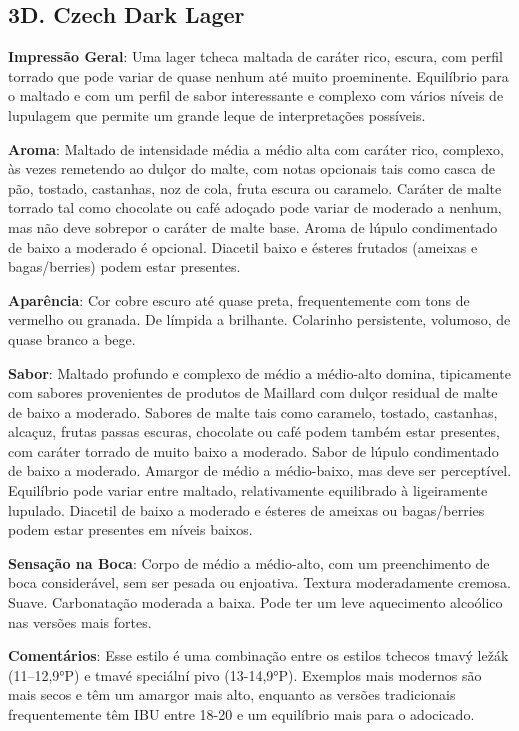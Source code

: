 \subsection*{3D. Czech Dark Lager}
\textbf{Impressão Geral}: Uma lager tcheca maltada de caráter rico, escura, com perfil torrado que pode variar de quase nenhum até muito proeminente. Equilíbrio para o maltado e com um perfil de sabor interessante e complexo com vários níveis de lupulagem que permite um grande leque de interpretações possíveis.

\textbf{Aroma}: Maltado de intensidade média a médio alta com caráter rico, complexo, às vezes remetendo ao dulçor do malte, com notas opcionais tais como casca de pão, tostado, castanhas, noz de cola, fruta escura ou caramelo. Caráter de malte torrado tal como chocolate ou café adoçado pode variar de moderado a nenhum, mas não deve sobrepor o caráter de malte base. Aroma de lúpulo condimentado de baixo a moderado é opcional. Diacetil baixo e ésteres frutados (ameixas e bagas/berries) podem estar presentes.

\textbf{Aparência}: Cor cobre escuro até quase preta, frequentemente com tons de vermelho ou granada. De límpida a brilhante. Colarinho persistente, volumoso, de quase branco a bege.

\textbf{Sabor}: Maltado profundo e complexo de médio a médio-alto domina, tipicamente com sabores provenientes de produtos de Maillard com dulçor residual de malte de baixo a moderado. Sabores de malte tais como caramelo, tostado, castanhas, alcaçuz, frutas passas escuras, chocolate ou café podem também estar presentes, com caráter torrado de muito baixo a moderado. Sabor de lúpulo condimentado de baixo a moderado. Amargor de médio a médio-baixo, mas deve ser perceptível. Equilíbrio pode variar entre maltado, relativamente equilibrado à ligeiramente lupulado. Diacetil de baixo a moderado e ésteres de ameixas ou bagas/berries podem estar presentes em níveis baixos.

\textbf{Sensação na Boca}: Corpo de médio a médio-alto, com um preenchimento de boca considerável, sem ser pesada ou enjoativa. Textura moderadamente cremosa. Suave. Carbonatação moderada a baixa. Pode ter um leve aquecimento alcoólico nas versões mais fortes.

\textbf{Comentários}: Esse estilo é uma combinação entre os estilos tchecos tmavý ležák (11–12,9°P) e tmavé speciální pivo (13-14,9°P). Exemplos mais modernos são mais secos e têm um amargor mais alto, enquanto as versões tradicionais frequentemente têm IBU entre 18-20 e um equilíbrio mais para o adocicado.

